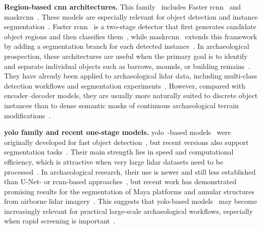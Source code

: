 \textbf{Region-based \gls{cnn} architectures.}
This family~\cite{Girshick_2014_CVPR} includes Faster \gls{rcnn}~\cite{Girshick_2015_ICCV,ren_faster_2017} and \gls{maskrcnn}~\cite{he_mask_2018}. These models are especially relevant for object detection and instance segmentation~\cite{fiorucci_deep_2022,guyot_objective_2021,verschoof-van_der_vaart_combining_2020}. Faster \gls{rcnn}~\cite{ren_faster_2017} is a two-stage detector that first generates candidate object regions and then classifies them~\cite{verschoof-van_der_vaart_combining_2020,griffiths_improving_2019,fiorucci_deep_2022}, while \gls{maskrcnn}~\cite{he_mask_2018} extends this framework by adding a segmentation branch for each detected instance~\cite{guyot_objective_2021,fylaktos_deep_2025,griffiths_improving_2019,bundzel_semantic_2020}. In archaeological prospection, these architectures are useful when the primary goal is to identify and separate individual objects such as barrows, mounds, or building remains~\cite{fiorucci_deep_2022,verschoof-van_der_vaart_combining_2020,guyot_objective_2021}. They have already been applied to archaeological \gls{lidar} data, including multi-class detection workflows and segmentation experiments~\cite{verschoof-van_der_vaart_combining_2020,guyot_objective_2021,bundzel_semantic_2020}. However, compared with encoder--decoder models, they are usually more naturally suited to discrete object instances than to dense semantic masks of continuous archaeological terrain modifications~\cite{bundzel_semantic_2020,fiorucci_deep_2022}.

\textbf{\gls{yolo} family and recent one-stage models.}
\gls{yolo}~\cite{redmon_you_2016}-based models~\cite{ultralytics_yolo} were originally developed for fast object detection~\cite{griffiths_improving_2019}, but recent versions also support segmentation tasks~\cite{zhang_unveiling_2024}. Their main strength lies in speed and computational efficiency, which is attractive when very large \gls{lidar} datasets need to be processed~\cite{zhang_unveiling_2024,azarkhordad_detecting_2025}. In archaeological research, their use is newer and still less established than U-Net- or \gls{rcnn}-based approaches~\cite{fiorucci_deep_2022,zhang_unveiling_2024}, but recent work has demonstrated promising results for the segmentation of Maya platforms and annular structures from airborne \gls{lidar} imagery~\cite{zhang_unveiling_2024}. This suggests that \gls{yolo}-based models~\cite{ultralytics_yolo,zhang_unveiling_2024,azarkhordad_detecting_2025} may become increasingly relevant for practical large-scale archaeological workflows, especially when rapid screening is important~\cite{zhang_unveiling_2024,azarkhordad_detecting_2025}.

